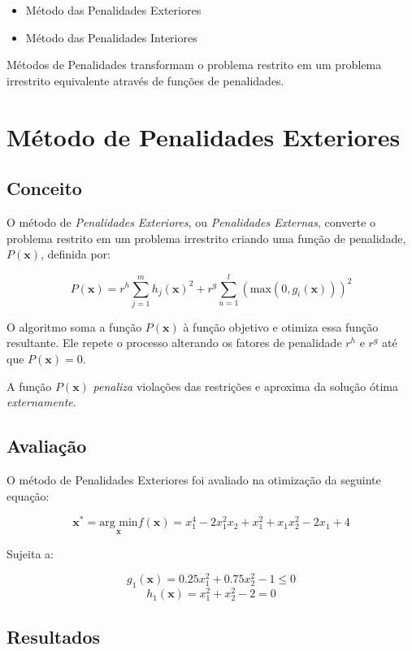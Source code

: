 \documentclass[10pt,a4paper]{article}
\begin{document}
	\begin{itemize}

		\item Método das Penalidades Exteriores

		\item Método das Penalidades Interiores

	\end{itemize}

	Métodos de Penalidades transformam o problema restrito em um problema irrestrito equivalente através de funções de penalidades.

	\section{Método de Penalidades Exteriores}

	\subsection{Conceito}

	O método de \emph{Penalidades Exteriores}, ou \emph{Penalidades Externas}, converte o problema restrito em um problema irrestrito criando uma função de penalidade, $P(\bm{x})$, definida por:

	$$ P(\bm{x}) = r^h \sum_{j=1}^{m} h_j (\bm{x})^2 + r^g \sum_{u=1}^l(\text{max}(0,g_i(\bm{x})))^2 $$

	O algoritmo soma a função $P(\bm{x})$ à função objetivo e otimiza essa função resultante. Ele repete o processo alterando os fatores de penalidade $r^h$ e $r^g$ até que $P(\bm{x}) = 0$.

	A função $P(\bm{x})$ \emph{penaliza} violações das restrições e aproxima da solução ótima \emph{externamente}. 

	\subsection{Avaliação}

	O método de Penalidades Exteriores foi avaliado na otimização da seguinte equação:

	$$ \bm{x^*} = \underset{\bm{x}}{\text{arg min}} f(\bm{x}) = x_1^4 - 2x_1^2x_2 + x_1^2 + x_1x_2^2 - 2x_1 + 4$$

	Sujeita a:

	$$ g_1(\bm{x}) = 0.25x_1^2 + 0.75x_2^2-1 \le 0 $$ 
	$$ h_1(\bm{x}) = x_1^2+x_2^2-2=0 $$

	\subsection{Resultados}
\end{document}
